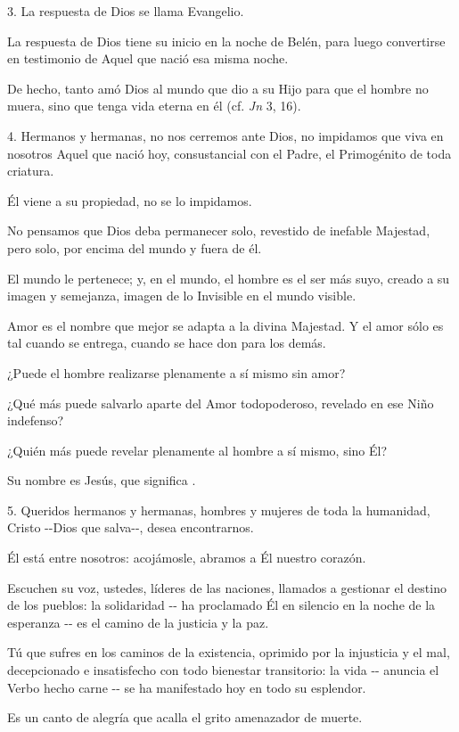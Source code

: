 \begin{body}
\begin{body}
		3. La respuesta de Dios se llama Evangelio.
		
		La respuesta de Dios tiene su inicio en la noche de Belén, para luego convertirse en testimonio de Aquel que nació esa misma noche.
		
		De hecho, tanto amó Dios al mundo que dio a su Hijo para que el hombre no muera, sino que tenga vida eterna en él (cf. \emph{Jn} 3, 16).
		
		4. Hermanos y hermanas, no nos cerremos ante Dios, no impidamos que viva en nosotros Aquel que nació hoy, consustancial con el Padre, el Primogénito de toda criatura.
		
		Él viene a su propiedad, no se lo impidamos.
		
		No pensamos que Dios deba permanecer solo, revestido de inefable Majestad, pero solo, por encima del mundo y fuera de él.
		
		El mundo le pertenece; y, en el mundo, el hombre es el ser más suyo, creado a su imagen y semejanza, imagen de lo Invisible en el mundo visible.
		
		Amor es el nombre que mejor se adapta a la divina Majestad. Y el amor sólo es tal cuando se entrega, cuando se hace don para los demás.
		
		¿Puede el hombre realizarse plenamente a sí mismo sin amor?
		
		¿Qué más puede salvarlo aparte del Amor todopoderoso, revelado en ese Niño indefenso?
		
		¿Quién más puede revelar plenamente al hombre a sí mismo, sino Él?
		
		Su nombre es Jesús, que significa .
		
		5. Queridos hermanos y hermanas, hombres y mujeres de toda la humanidad, Cristo -\/-Dios que salva-\/-, desea encontrarnos.
		
		Él está entre nosotros: acojámosle, abramos a Él nuestro corazón.
		
		Escuchen su voz, ustedes, líderes de las naciones, llamados a gestionar el destino de los pueblos: la solidaridad -\/- ha proclamado Él en silencio en la noche de la esperanza -\/- es el camino de la justicia y la paz.
		
		Tú que sufres en los caminos de la existencia, oprimido por la injusticia y el mal, decepcionado e insatisfecho con todo bienestar transitorio: la vida -\/- anuncia el Verbo hecho carne -\/- se ha manifestado hoy en todo su esplendor.
		
		Es un canto de alegría que acalla el grito amenazador de muerte.
		

\end{body}
\end{body}

